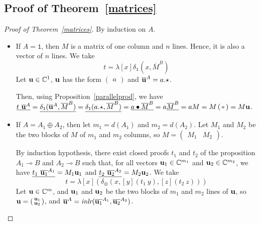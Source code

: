 \documentclass[screen, sigconf,authorversion,nonacm]{acmart}
\theoremstyle{acmdefinition}
\numberwithin{equation}{section}
\newcommand\abstr[1]{[#1]}
\newcommand\inlr{\mbox{\it inlr}}
\newcommand\one{\ensuremath{\mathtt 1}}
\newcommand\elimone{\delta_{\one}}
\newcommand\elimplus{\delta_{\oplus}}
\begin{document}
\subsection{Proof of Theorem~\ref{matrices}}
\begin{proof}[Proof of Theorem~\ref{matrices}]
  By induction on $A$.
  \begin{itemize}

    \item If $A = \one$, then $M$ is a matrix of one column and
      $n$ lines. Hence, it is also a vector of $n$ lines.
      We take
      $$t = \lambda \abstr{x} \elimone(x,\overline{M}^B)$$
      Let ${\bf u} \in {\mathbb C}^1$, ${\bf u}$ has the form
      $\left(\begin{smallmatrix}  a \end{smallmatrix}\right)$ and 
      $\overline{\bf u}^A = a.\star$.

      Then, using
      Proposition~\ref{parallelprod}, we have $\underline{t~\overline{\bf u}^A} 
      = \underline{\elimone(\overline{\bf u}^A,\overline{M}^B)}
      = \underline{\elimone(a.\star,\overline{M}^B)}
      = \underline{a \bullet \overline{M}^B}
      = a \underline{\overline{M}^B} = a M = M
      \left(\begin{smallmatrix}  a\end{smallmatrix}\right) =
      M {\bf u}$.

    \item If $A = A_1 \oplus A_2$, then let $m_1 = d(A_1)$ and $m_2 =
      d(A_2)$.  Let $M_1$ and $M_2$ be the two blocks of $M$ of $m_1$ and
      $m_2$ columns, so $M = \left(\begin{smallmatrix} M_1 &
      M_2\end{smallmatrix}\right)$.

      By induction hypothesis, there exist closed proofs $t_1$ and $t_2$ of
      the proposition
      $A_1 \multimap B$ and $A_2 \multimap B$
      such that, for all
      vectors ${\bf u}_1 \in {\mathbb C}^{m_1}$ and 
      ${\bf u}_2 \in {\mathbb C}^{m_2}$,
      we have
      $\underline{t_1~\overline{{\bf u}_1}^{A_1}} = M_1 {\bf u}_1$ and
      $\underline{t_2~\overline{{\bf u}_2}^{A_2}} = M_2 {\bf u}_2$.  We take
      $$t = \lambda \abstr{x} (\elimplus(x, \abstr{y} (t_1~y),
      \abstr{z} (t_2~z)))$$
      Let ${\bf u} \in {\mathbb C}^m$, and ${\bf u}_1$ and ${\bf
      u}_2$ be the two blocks of $m_1$ and $m_2$ lines of ${\bf u}$, so ${\bf
      u} = \left(\begin{smallmatrix} {\bf u}_1 \\ {\bf
      u}_2 \end{smallmatrix}\right)$, and $\overline{\bf u}^A =
      \inlr(\overline{{\bf u}_1}^{A_1},\overline{{\bf u}_2}^{A_2})$.


\end{itemize}
\end{proof}
\end{document}
